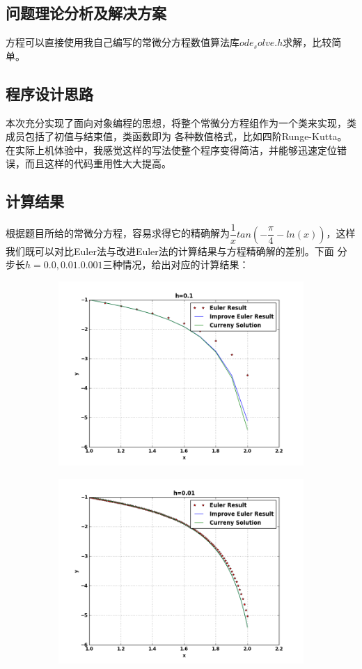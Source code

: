 \documentclass[10pt,a4paper]{ctexart}
\begin{document}
\subsection{问题理论分析及解决方案}
方程可以直接使用我自己编写的常微分方程数值算法库$ode_solve.h$求解，比较简单。
\subsection{程序设计思路}
本次充分实现了面向对象编程的思想，将整个常微分方程组作为一个类来实现，类成员包括了初值与结束值，类函数即为
各种数值格式，比如四阶Runge-Kutta。在实际上机体验中，我感觉这样的写法使整个程序变得简洁，并能够迅速定位错误，而且这样的代码重用性大大提高。
\subsection{计算结果}
根据题目所给的常微分方程，容易求得它的精确解为$\dfrac{1}{x}tan(-\dfrac{\pi}{4}-ln(x))$，这样我们既可以对比Euler法与改进Euler法的计算结果与方程精确解的差别。下面
分步长$h=0.0,0.01.0.001$三种情况，给出对应的计算结果：
\par
\centerline{\includegraphics[height=7cm,width=14cm]{0.1h.png}}
\par
\par
\centerline{\includegraphics[height=7cm,width=14cm]{0.01h.png}}
\end{document}
